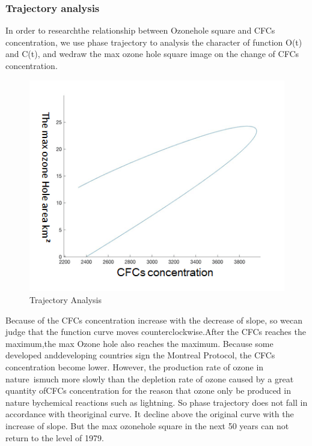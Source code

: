 \documentclass[12pt]{article}
\begin{document}
\subsubsection{Trajectory analysis}
In order to researchthe relationship between Ozonehole square and CFCs concentration, we use phase trajectory to analysis the character of function O(t) and C(t), and wedraw the max ozone hole square image on the change of CFCs concentration.
\begin{center}
\begin{figure}[htpb]
\centering
\includegraphics[scale=0.6]{tl}
\caption{Trajectory Analysis}\label{fig:xgx}
\end{figure}
\end{center}
Because of the CFCs concentration increase with the decrease of slope, so wecan judge that the function curve moves counterclockwise.After the CFCs reaches the maximum,the max Ozone hole also reaches the maximum. Because some developed anddeveloping countries sign the Montreal Protocol, the CFCs \cite{sokhi2006prediction} concentration become lower. However, the production rate of ozone in nature ismuch more slowly than the depletion rate of ozone caused by a great quantity ofCFCs concentration for the reason that ozone only be produced in nature bychemical reactions such as lightning. So phase trajectory does not fall in accordance with theoriginal curve. It decline above the original curve with the increase of slope. But the max ozonehole square in the next 50 years can not return to the level of 1979.
\end{document}

